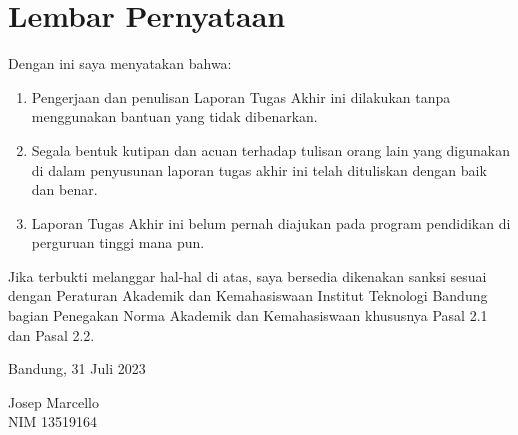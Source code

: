 \chapter*{Lembar Pernyataan}

Dengan ini saya menyatakan bahwa:

\begin{enumerate}

	\item Pengerjaan dan penulisan Laporan Tugas Akhir ini dilakukan tanpa
	      menggunakan bantuan yang tidak dibenarkan.
	\item Segala bentuk kutipan dan acuan terhadap tulisan orang lain yang
	      digunakan di dalam penyusunan laporan tugas akhir ini telah dituliskan
	      dengan baik dan benar.
	\item Laporan Tugas Akhir ini belum pernah diajukan pada program pendidikan
	      di perguruan tinggi mana pun.

\end{enumerate}

Jika terbukti melanggar hal-hal di atas, saya bersedia dikenakan sanksi sesuai
dengan Peraturan Akademik dan Kemahasiswaan Institut Teknologi Bandung bagian
Penegakan Norma Akademik dan Kemahasiswaan khususnya Pasal 2.1 dan Pasal 2.2.

\vspace{10mm}

Bandung, 31 Juli 2023

\vspace{30mm}

Josep Marcello \\
NIM 13519164
